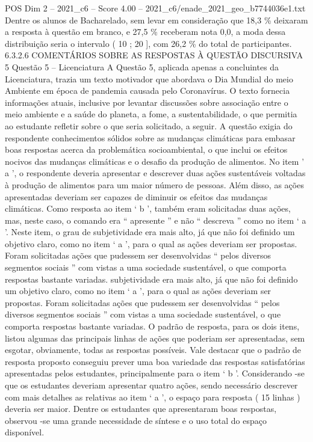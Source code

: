 \begin{textsample}{POS Dim 2 – 2021\_c6 – Score 4.00 – 2021\_c6/enade\_2021\_geo\_b7744036e1.txt}
Dentre os alunos de Bacharelado, sem levar em consideração que 18,3 \% deixaram a resposta à questão em branco, e 27,5 \% receberam nota 0,0, a moda dessa distribuição seria o intervalo ( 10 ; 20 ], com 26,2 \% do total de participantes. 6.3.2.6 COMENTÁRIOS SOBRE AS RESPOSTAS À QUESTÃO DISCURSIVA 5 Questão 5 – Licenciatura A Questão 5, aplicada apenas a concluintes da Licenciatura, trazia um texto motivador que abordava o Dia Mundial do meio Ambiente em época de pandemia causada pelo Coronavírus.
O texto fornecia informações atuais, inclusive por levantar discussões sobre associação entre o meio ambiente e a saúde do planeta, a fome, a sustentabilidade, o que permitia ao estudante refletir sobre o que seria solicitado, a seguir.
A questão exigia do respondente conhecimentos sólidos sobre as mudanças climáticas para embasar boas respostas acerca da problemática socioambiental, o que inclui os efeitos nocivos das mudanças climáticas e o desafio da produção de alimentos.
No item ’ a ’, o respondente deveria apresentar e descrever duas ações sustentáveis voltadas à produção de alimentos para um maior número de pessoas.
Além disso, as ações apresentadas deveriam ser capazes de diminuir os efeitos das mudanças climáticas.
Como resposta ao item ‘ b ’, também eram solicitadas duas ações, mas, neste caso, o comando era “ apresente ” e não “ descreva ” como no item ‘ a ’.
Neste item, o grau de subjetividade era mais alto, já que não foi definido um objetivo claro, como no item ‘ a ’, para o qual as ações deveriam ser propostas.
Foram solicitadas ações que pudessem ser desenvolvidas “ pelos diversos segmentos sociais ” com vistas a uma sociedade sustentável, o que comporta respostas bastante variadas. subjetividade era mais alto, já que não foi definido um objetivo claro, como no item ‘ a ’, para o qual as ações deveriam ser propostas.
Foram solicitadas ações que pudessem ser desenvolvidas “ pelos diversos segmentos sociais ” com vistas a uma sociedade sustentável, o que comporta respostas bastante variadas.
O padrão de resposta, para os dois itens, listou algumas das principais linhas de ações que poderiam ser apresentadas, sem esgotar, obviamente, todas as respostas possíveis.
Vale destacar que o padrão de resposta proposto conseguiu prever uma boa variedade das respostas satisfatórias apresentadas pelos estudantes, principalmente para o item ‘ b ’.
Considerando -se que os estudantes deveriam apresentar quatro ações, sendo necessário descrever com mais detalhes as relativas ao item ‘ a ’, o espaço para resposta ( 15 linhas ) deveria ser maior.
Dentre os estudantes que apresentaram boas respostas, observou -se uma grande necessidade de síntese e o uso total do espaço disponível.

\end{textsample}
